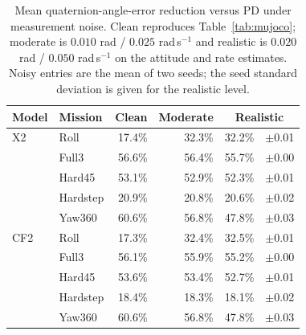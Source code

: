 \begin{table}[t]
\caption{Mean quaternion-angle-error reduction versus PD under measurement noise. Clean reproduces Table~\ref{tab:mujoco}; moderate is $0.010$ rad / $0.025$ rad\,s$^{-1}$ and realistic is $0.020$ rad / $0.050$ rad\,s$^{-1}$ on the attitude and rate estimates. Noisy entries are the mean of two seeds; the seed standard deviation is given for the realistic level.}
\label{tab:noise}\centering\small
\begin{tabular}{llrrr@{\,}l}
\toprule
Model&Mission&Clean&Moderate&\multicolumn{2}{c}{Realistic}\\\midrule
X2&Roll&17.4\%&32.3\%&32.2\%&$\pm$0.01\\
&Full3&56.6\%&56.4\%&55.7\%&$\pm$0.00\\
&Hard45&53.1\%&52.9\%&52.3\%&$\pm$0.01\\
&Hardstep&20.9\%&20.8\%&20.6\%&$\pm$0.02\\
&Yaw360&60.6\%&56.8\%&47.8\%&$\pm$0.03\\
\midrule
CF2&Roll&17.3\%&32.4\%&32.5\%&$\pm$0.01\\
&Full3&56.1\%&55.9\%&55.2\%&$\pm$0.00\\
&Hard45&53.6\%&53.4\%&52.7\%&$\pm$0.01\\
&Hardstep&18.4\%&18.3\%&18.1\%&$\pm$0.02\\
&Yaw360&60.6\%&56.8\%&47.8\%&$\pm$0.03\\
\bottomrule
\end{tabular}
\end{table}